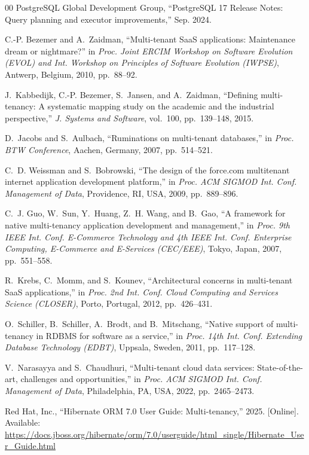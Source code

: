 \documentclass[conference]{IEEEtran}
\begin{document}
\begin{thebibliography}{00}
PostgreSQL Global Development Group, ``PostgreSQL 17 Release Notes: Query planning and executor improvements,'' Sep. 2024.

C.-P. Bezemer and A.~Zaidman, ``Multi-tenant SaaS applications: Maintenance dream or nightmare?'' in \emph{Proc. Joint ERCIM Workshop on Software Evolution (EVOL) and Int. Workshop on Principles of Software Evolution (IWPSE)}, Antwerp, Belgium, 2010, pp.~88--92.

J.~Kabbedijk, C.-P. Bezemer, S.~Jansen, and A.~Zaidman, ``Defining multi-tenancy: A systematic mapping study on the academic and the industrial perspective,'' \emph{J. Systems and Software}, vol.~100, pp.~139--148, 2015.

D.~Jacobs and S.~Aulbach, ``Ruminations on multi-tenant databases,'' in \emph{Proc. BTW Conference}, Aachen, Germany, 2007, pp.~514--521.

C.~D. Weissman and S.~Bobrowski, ``The design of the force.com multitenant internet application development platform,'' in \emph{Proc. ACM SIGMOD Int. Conf. Management of Data}, Providence, RI, USA, 2009, pp.~889--896.

C.~J. Guo, W.~Sun, Y.~Huang, Z.~H. Wang, and B.~Gao, ``A framework for native multi-tenancy application development and management,'' in \emph{Proc. 9th IEEE Int. Conf. E-Commerce Technology and 4th IEEE Int. Conf. Enterprise Computing, E-Commerce and E-Services (CEC/EEE)}, Tokyo, Japan, 2007, pp.~551--558.

R.~Krebs, C.~Momm, and S.~Kounev, ``Architectural concerns in multi-tenant SaaS applications,'' in \emph{Proc. 2nd Int. Conf. Cloud Computing and Services Science (CLOSER)}, Porto, Portugal, 2012, pp.~426--431.

O.~Schiller, B.~Schiller, A.~Brodt, and B.~Mitschang, ``Native support of multi-tenancy in RDBMS for software as a service,'' in \emph{Proc. 14th Int. Conf. Extending Database Technology (EDBT)}, Uppsala, Sweden, 2011, pp.~117--128.

V.~Narasayya and S.~Chaudhuri, ``Multi-tenant cloud data services: State-of-the-art, challenges and opportunities,'' in \emph{Proc. ACM SIGMOD Int. Conf. Management of Data}, Philadelphia, PA, USA, 2022, pp.~2465--2473.

Red Hat, Inc., ``Hibernate ORM 7.0 User Guide: Multi-tenancy,'' 2025. [Online]. Available: \url{https://docs.jboss.org/hibernate/orm/7.0/userguide/html_single/Hibernate_User_Guide.html}


\end{thebibliography}
\end{document}

